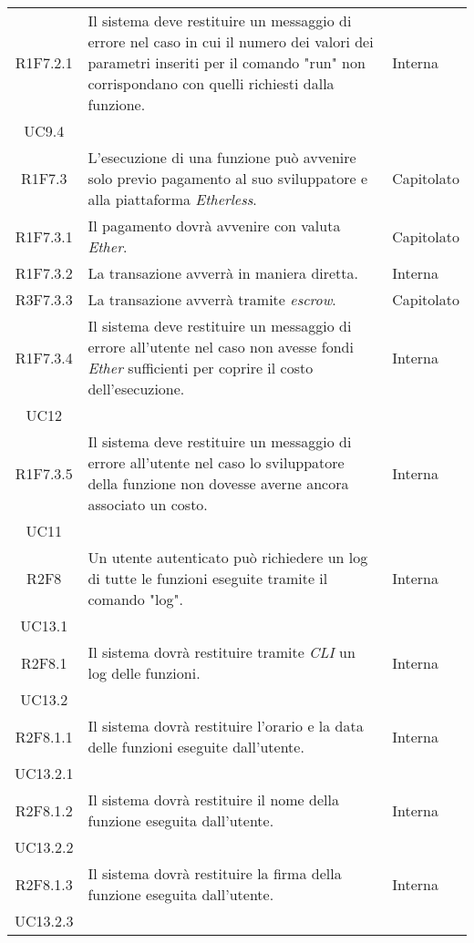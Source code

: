 \begin{longtable}{|c|p{8cm}|C{2cm}|}
	R1F7.2.1 &  Il sistema deve restituire un messaggio di errore nel caso in cui il numero dei valori dei parametri inseriti per il comando "run" non corrispondano con quelli richiesti dalla funzione.  & \centering Interna \\ UC9.4 \tabularnewline
		
	R1F7.3 &  L'esecuzione di una funzione può avvenire solo previo pagamento al suo sviluppatore e alla piattaforma \textit{Etherless}. & Capitolato \\
	
	R1F7.3.1 &  Il pagamento dovrà avvenire con valuta \textit{Ether\glos}. & Capitolato \\
	
	R1F7.3.2 &  La transazione avverrà in maniera diretta. & Interna \\
	
	R3F7.3.3 &  La transazione avverrà tramite \textit{escrow\glos}. & Capitolato \\
	
	R1F7.3.4 &  Il sistema deve restituire un messaggio di errore all'utente nel caso non avesse fondi  \textit{Ether\glos} sufficienti per coprire il costo dell'esecuzione. & \centering Interna \\ UC12 \tabularnewline
	
	R1F7.3.5 &  Il sistema deve restituire un messaggio di errore all'utente nel caso lo sviluppatore della funzione non dovesse averne ancora associato un costo. & \centering Interna \\ UC11 \tabularnewline
	
	R2F8 &  Un utente autenticato può richiedere un log di tutte le funzioni eseguite tramite il comando "log". & \centering Interna \\ UC13.1 \tabularnewline
	
	R2F8.1 &  Il sistema dovrà restituire tramite \textit{CLI\glo} un log delle funzioni. & \centering Interna \\ UC13.2 \tabularnewline
	
	R2F8.1.1 &  Il sistema dovrà restituire l'orario e la data delle funzioni eseguite dall'utente. & \centering Interna \\ UC13.2.1 \tabularnewline
	
	R2F8.1.2 &  Il sistema dovrà restituire il nome della funzione eseguita dall'utente. & \centering Interna \\ UC13.2.2 \tabularnewline
	
	R2F8.1.3 &  Il sistema dovrà restituire la firma della funzione eseguita dall'utente. & \centering Interna \\ UC13.2.3 \tabularnewline
	

\end{longtable}
